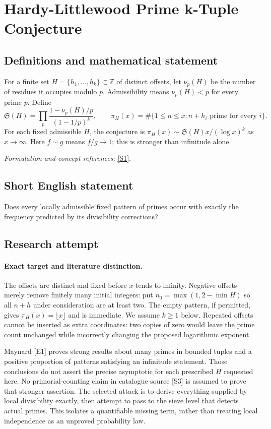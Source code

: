 \documentclass[11pt]{article}
\begin{document}
\section*{\texorpdfstring{Hardy-Littlewood Prime k-Tuple Conjecture}{Hardy-Littlewood Prime k-Tuple Conjecture}}\label{statement}
\subsection{Definitions and mathematical statement}
For a finite set $H=\{h_1,\ldots,h_k\}\subset{\mathbb{Z}}$ of distinct offsets, let $\nu_p(H)$ be the number of residues it occupies modulo $p$. Admissibility means $\nu_p(H)<p$ for every prime $p$. Define
\[
 \mathfrak S(H)=\prod_p\frac{1-\nu_p(H)/p}{(1-1/p)^k},\qquad
 \pi_H(x)=\#\{1\le n\le x:n+h_i\text{ prime for every }i\}.
\]
For each fixed admissible $H$, the conjecture is $\pi_H(x)\sim\mathfrak S(H)x/(\log x)^k$ as $x\to\infty$. Here $f\sim g$ means $f/g\to1$; this is stronger than infinitude alone.
\par\smallskip\textit{Formulation and concept references:} \href{https://mathworld.wolfram.com/k-TupleConjecture.html}{[S1]}.

\subsection{Short English statement}
Does every locally admissible fixed pattern of primes occur with exactly the frequency predicted by its divisibility corrections?
\subsection{Research attempt}

\paragraph{Exact target and literature distinction.}
The offsets are distinct and fixed before $x$ tends to infinity. Negative
offsets merely remove finitely many initial integers: put
$n_0=\max(1,2-\min H)$ so all $n+h$ under consideration are at least two.
The empty pattern, if permitted, gives $\pi_H(x)=\lfloor x\rfloor$ and
is immediate. We assume $k\ge1$ below. Repeated offsets cannot be inserted
as extra coordinates: two copies of zero would leave the prime count
unchanged while incorrectly changing the proposed logarithmic exponent.

Maynard [E1] proves strong results about many primes in bounded tuples
and a positive proportion of patterns satisfying an infinitude statement.
Those conclusions do not assert the precise asymptotic for each prescribed
$H$ requested here. No primorial-counting claim in catalogue source [S3]
is assumed to prove that stronger assertion. The selected attack is to
derive everything supplied by local divisibility exactly, then attempt
to pass to the sieve level that detects actual primes. This isolates a
quantifiable missing term, rather than treating local independence as an
unproved probability law.
\end{document}
